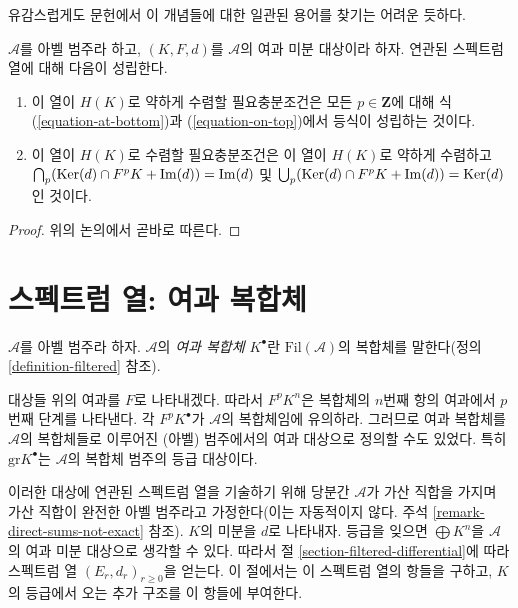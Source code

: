 \noindent
유감스럽게도 문헌에서 이 개념들에 대한 일관된 용어를 찾기는 어려운
듯하다.

\begin{lemma}
\label{lemma-filtered-differential-ss-converges}
$\mathcal{A}$를 아벨 범주라 하고, $(K, F, d)$를 $\mathcal{A}$의 여과
미분 대상이라 하자. 연관된 스펙트럼 열에 대해 다음이 성립한다.
\begin{enumerate}
\item 이 열이 $H(K)$로 약하게 수렴할 필요충분조건은 모든
$p \in \mathbf{Z}$에 대해 식 (\ref{equation-at-bottom})과
(\ref{equation-on-top})에서 등식이 성립하는 것이다.
\item 이 열이 $H(K)$로 수렴할 필요충분조건은 이 열이 $H(K)$로 약하게
수렴하고
$\bigcap_p (\mathop{\mathrm{Ker}}(d) \cap F^pK + \mathop{\mathrm{Im}}(d)) = \mathop{\mathrm{Im}}(d)$
및 $\bigcup_p (\mathop{\mathrm{Ker}}(d) \cap F^pK + \mathop{\mathrm{Im}}(d)) = \mathop{\mathrm{Ker}}(d)$인 것이다.
\end{enumerate}
\end{lemma}

\begin{proof}
위의 논의에서 곧바로 따른다.
\end{proof}

\section{스펙트럼 열: 여과 복합체}
\label{section-filtered-complex}

\begin{definition}
\label{definition-filtered-complex}
$\mathcal{A}$를 아벨 범주라 하자. $\mathcal{A}$의
{\it 여과 복합체 $K^\bullet$}란 $\text{Fil}(\mathcal{A})$의 복합체를
말한다(정의 \ref{definition-filtered} 참조).
\end{definition}

\noindent
대상들 위의 여과를 $F$로 나타내겠다. 따라서 $F^pK^n$은 복합체의
$n$번째 항의 여과에서 $p$번째 단계를 나타낸다. 각 $F^pK^\bullet$가
$\mathcal{A}$의 복합체임에 유의하라. 그러므로 여과 복합체를
$\mathcal{A}$의 복합체들로 이루어진 (아벨) 범주에서의 여과 대상으로
정의할 수도 있었다. 특히 $\text{gr} K^\bullet$는 $\mathcal{A}$의
복합체 범주의 등급 대상이다.

\medskip\noindent
이러한 대상에 연관된 스펙트럼 열을 기술하기 위해 당분간
$\mathcal{A}$가 가산 직합을 가지며 가산 직합이 완전한 아벨 범주라고
가정한다(이는 자동적이지 않다. 주석 \ref{remark-direct-sums-not-exact} 참조).
$K$의 미분을 $d$로 나타내자.
등급을 잊으면 $\bigoplus K^n$을 $\mathcal{A}$의 여과 미분 대상으로
생각할 수 있다. 따라서 절 \ref{section-filtered-differential}에 따라
스펙트럼 열 $(E_r, d_r)_{r \geq 0}$을 얻는다. 이 절에서는 이 스펙트럼
열의 항들을 구하고, $K$의 등급에서 오는 추가 구조를 이 항들에 부여한다.

